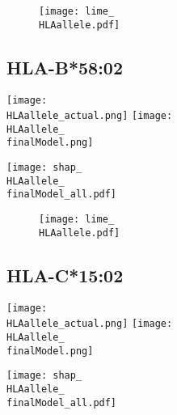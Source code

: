 \documentclass[msc,deptreport,ai]{infthesis} %
\newcommand{\finalModel}{epoch=4-step=3648186}
\newcommand{\HLAallele}{HLA-A3301}
\newcommand{\HLAalleleName}{HLA-A*33:01}
\begin{document}
				\noindent \begin{figure}[H] {\centering
						\texttt{[image: lime\_\\HLAallele.pdf]} 
						\label{fig:LIME_\HLAallele} }
				\end{figure}

		\renewcommand{\HLAallele}{HLA-B5802}
		\renewcommand{\HLAalleleName}{HLA-B*58:02}
		\subsection{\HLAalleleName}
				\noindent \begin{minipage}[c][4.2cm][t]{7cm}
					\begin{center}
					\texttt{[image: \\HLAallele\_actual.png]}
					\texttt{[image: \\HLAallele\_\\finalModel.png]} 
					\end{center}
				\end{minipage}
				\begin{minipage}[c][4.2cm][t]{7cm}
					\begin{center}
					\texttt{[image: shap\_\\HLAallele\_\\finalModel\_all.pdf]}
					\end{center}
				\end{minipage}
				
				\noindent \begin{figure}[H] {\centering
						\texttt{[image: lime\_\\HLAallele.pdf]} 
						\label{fig:LIME_\HLAallele} }
				\end{figure}

		\renewcommand{\HLAallele}{HLA-C1502}
		\renewcommand{\HLAalleleName}{HLA-C*15:02}
		\subsection{\HLAalleleName}
				\noindent \begin{minipage}[c][4.2cm][t]{7cm}
					\begin{center}
					\texttt{[image: \\HLAallele\_actual.png]}
					\texttt{[image: \\HLAallele\_\\finalModel.png]} 
					\end{center}
				\end{minipage}
				\begin{minipage}[c][4.2cm][t]{7cm}
					\begin{center}
					\texttt{[image: shap\_\\HLAallele\_\\finalModel\_all.pdf]}
					\end{center}
				\end{minipage}
				
\end{document}
